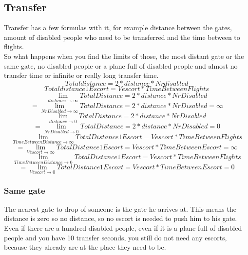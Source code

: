 \documentclass[a4paper, 11pt, notitlepage]{report}
\begin{document}
\subsection{Transfer}
Transfer has a few formulas with it, for example distance between the gates, amount of disabled people who need to be transferred and the time between to flights. \\
So what happens when you find the limits of those, the most distant gate or the same gate, no disabled people or a plane full of disabled people and almost no transfer time or infinite or really long transfer time.\\
\begin{equation}
Totaldistance = 2 * distance *Nrdisabled
\end{equation}
\begin{equation}
Totaldistance1Escort= Vescort * TimeBetweenFlights
\end{equation}
\begin{equation}
\lim_{distance \rightarrow \infty} TotalDistance = 2 * distance * NrDisabled
\end{equation}
\begin{equation}
 = \lim_{NrDisabled \rightarrow \infty} TotalDistance = 2 * distance * NrDisabled = \infty
\end{equation}
\begin{equation}
\lim_{distance \rightarrow 0} TotalDistance = 2 * distance * NrDisabled
\end{equation}
\begin{equation}
= \lim_{NrDisabled \rightarrow 0} TotalDistance = 2 * distance * NrDisabled = 0
\end{equation}
\begin{equation}
\lim_{TimeBetweenDistance \rightarrow \infty} TotalDistance1Escort = Vescort*TimeBetweenFlights
\end{equation}
\begin{equation}
= \lim_{Vescort \rightarrow \infty} TotalDistance1Escort = Vescort*TimeBetweenEscort = \infty
\end{equation}
\begin{equation}
\lim_{TimeBetweenDistance \rightarrow 0} TotalDistance1Escort = Vescort*TimeBetweenFlights
\end{equation}
\begin{equation}
= \lim_{Vescort \rightarrow 0} TotalDistance1Escort = Vescort*TimeBetweenEscort = 0
\end{equation}

\subsubsection{Same gate}
The nearest gate to drop of someone is the gate he arrives at. This means the distance is zero so no distance, so no escort is needed to push him to his gate. Even if there are a hundred disabled people, even if it is a plane full of disabled people and you have 10 transfer seconds, you still do not need any escorts, because they already are at the place they need to be.
\end{document}

